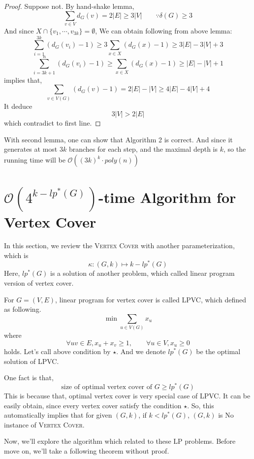\documentclass[12pt, a4paper, openany, twoside]{book}
\theoremstyle{definition}
\theoremstyle{remark}
\newcommand{\CO}{{\mathcal {O}}} \newcommand{\CP}{{\mathcal {P}}}
\theoremstyle{plain}
\numberwithin{equation}{section}
\begin{document}
\begin{proof}
    
Suppose not. By hand-shake lemma, 
\[\sum_{v \in V} d_G(v) = 2|E| \geq 3|V| \qquad \text{$\because \delta(G) \geq 3$}\]
And since $X \cap \{v_1, \cdots, v_{3k}\} = \emptyset$, 
We can obtain following from above lemma:
\[\sum_{i = 1}^{3k} (d_G(v_i)-1) \geq 3 \sum_{x \in X} (d_G(x)-1) \geq 3|E| - 3|V| + 3 \] 
\[\sum_{i = 3k+1}^{n} (d_G(v_i) - 1) \geq \sum_{x \in X} (d_G(x) - 1) \geq |E| - |V| + 1\]
implies that, 
\[\sum_{v \in V(G)} (d_G(v) - 1) = 2|E| - |V| \geq 4|E| - 4|V| + 4\]
It deduce 
\[3|V| > 2|E|\]
which contradict to first line.
\end{proof}

With second lemma, one can show that Algorithm 2 is correct. And since it generates at most $3k$ branches for each step, and the maximal depth is $k$, so the running time will be $\CO((3k)^k \cdot poly(n))$

\section{$\CO(4^{k-lp^*(G)})$-time Algorithm for Vertex Cover}

In this section, we review the \textsc{Vertex Cover} with another parameterization, which is 
\[\kappa : (G, k) \mapsto k - lp^*(G)\]
Here, $lp^*(G)$ is a solution of another problem, which called linear program version of vertex cover. 
\begin{tcolorbox}[colback=yellow!10!white,colframe=red!75!black,title=Linear Program for Vertex Cover]

For $G = (V, E)$, linear program for vertex cover is called \textsc{LPVC}, which defined as following. 
\[\min \sum_{u \in V(G)} x_u\]
where 
\[\forall uv \in E, x_u + x_v \geq 1, \qquad  \forall u \in V, x_u \geq 0 \tag{$\star$}\]
holds. Let's call above condition by $\star$. And we denote $lp^*(G)$ be the optimal solution of \textsc{LPVC}. 

\end{tcolorbox}

One fact is that, 
\[\text{size of optimal vertex cover of $G$} \geq lp^*(G)\]
This is because that, optimal vertex cover is very special case of \textsc{LPVC}. It can be easily obtain, since 
every vertex cover satisfy the condition $\star$. So, this automatically implies that 
for given $(G, k)$, if $k < lp^*(G)$, $(G, k)$ is No instance of \textsc{Vertex Cover}. 

Now, we'll explore the algorithm which related to these LP problems. Before move on, we'll take a following theorem without proof. 
\end{document}
